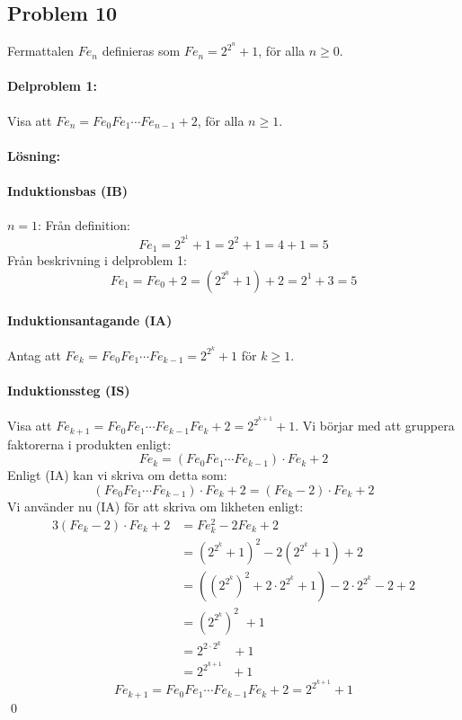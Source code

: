 \subsection*{Problem 10}

Fermattalen $Fe_n$ definieras som $Fe_n=2^{2^n}+1$, för alla $n\ge 0$.
\paragraph{Delproblem 1:} Visa att $Fe_n=Fe_0Fe_1\cdots Fe_{n-1}+2$, för alla $n\ge 1$.

\paragraph{Lösning:}
\paragraph{Induktionsbas (IB)} $n=1$:
Från definition:
\[Fe_1 = 2^{2^1}+1 = 2^2+1 = 4+1 = 5\]
Från beskrivning i delproblem 1:
\[Fe_1 = Fe_0+2 = (2^{2^0}+1) + 2 = 2^1+3 = 5\]

\paragraph{Induktionsantagande (IA)} Antag att \(Fe_k=Fe_0Fe_1\cdots Fe_{k-1}=2^{2^k}+1\) för $k\ge 1$.

\paragraph{Induktionssteg (IS)} Visa att \(Fe_{k+1}=Fe_0Fe_1\cdots Fe_{k-1}Fe_{k}+2 = 2^{2^{k+1}}+1\).\newline\noindent
Vi börjar med att gruppera faktorerna i produkten enligt:
\[Fe_k=(Fe_0Fe_1\cdots Fe_{k-1})\cdot Fe_{k}+2\]
Enligt (IA) kan vi skriva om detta som: 
\[(Fe_0Fe_1\cdots Fe_{k-1})\cdot Fe_{k}+2 = (Fe_{k}-2)\cdot Fe_{k} + 2\]
Vi använder nu (IA) för att skriva om likheten enligt:
\begin{alignat*}{3}
(Fe_k-2)\cdot Fe_k + 2 &= Fe_k^2-2Fe_k+2 \\[5pt]
&= (2^{2^k}+1)^2-2(2^{2^k}+1)+2 \\[5pt]
&= ((2^{2^k})^2+2\cdot 2^{2^k}+1)-2\cdot 2^{2^k} - 2 + 2 \\[5pt]
&= (2^{2^k})^2\hspace{4pt}+1 \\[5pt]
&= 2^{2\cdot 2^k}\hspace{10pt}+1 \\[5pt]
&= 2^{2^{k+1}}\hspace{8pt}+1
\end{alignat*}
\[Fe_{k+1}=Fe_0Fe_1\cdots Fe_{k-1}Fe_{k}+2 = 2^{2^{k+1}}+1\]
\hfill\qed


